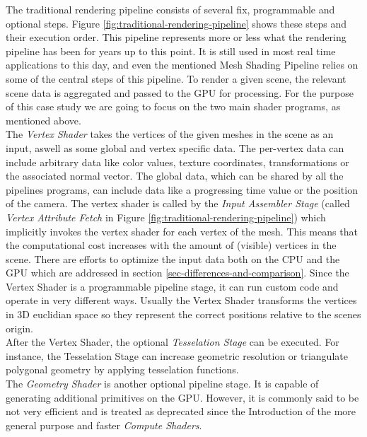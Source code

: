 \noindent
The traditional rendering pipeline consists of several fix, programmable and optional steps.
Figure \ref{fig:traditional-rendering-pipeline} shows these steps and their execution order. 
This pipeline represents more or less what the rendering pipeline has been for years up to this point. 
It is still used in most real time applications to this day, and even the mentioned Mesh Shading 
Pipeline relies on some of the central steps of this pipeline. To render a given scene, the relevant 
scene data is aggregated and passed to the \ac{GPU} for processing. For the purpose of this case study 
we are going to focus on the two main shader programs, as mentioned above. \\


\noindent
The \emph{Vertex Shader} takes the vertices of the given meshes in the scene as an input, aswell as 
some global and vertex specific data. The per-vertex data can include arbitrary data like color values, 
texture coordinates, transformations or the associated normal vector. The global data, which can be shared
by all the pipelines programs, can include data like a progressing time value or the position of the camera.
The vertex shader is called by the \emph{Input Assembler Stage} (called \emph{Vertex Attribute Fetch} in 
Figure \ref{fig:traditional-rendering-pipeline}) which implicitly invokes the vertex shader for each vertex 
of the mesh. This means that the computational cost increases with the amount of (visible) vertices in the scene. 
There are efforts to optimize the input data both on the \ac{CPU} and the \ac{GPU} which are addressed in section 
\ref{sec-differences-and-comparison}. Since the Vertex Shader is a programmable pipeline stage, it can run  %
custom code and operate in very different ways. Usually the Vertex Shader transforms the vertices in 3D 
euclidian space so they represent the correct positions relative to the scenes origin. \\

\noindent
After the Vertex Shader, the optional \emph{Tesselation Stage} can be executed. 
For instance, the Tesselation Stage can increase geometric resolution or triangulate polygonal geometry by 
applying tesselation functions. \\

\noindent
The \emph{Geometry Shader} is another optional pipeline stage. It is capable of generating additional primitives 
on the GPU. However, it is commonly said to be not very efficient and is treated as deprecated since the Introduction 
of the more general purpose and faster \emph{Compute Shaders}. \\ %

